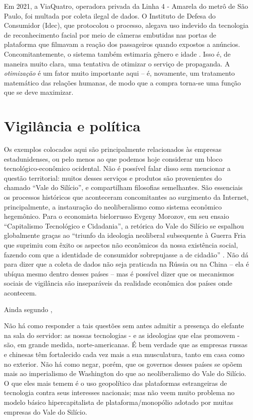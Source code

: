 Em 2021, a ViaQuatro, operadora privada da Linha 4 - Amarela do metrô de São Paulo, foi multada por coleta ilegal de dados.
O Instituto de Defesa do Consumidor (Idec), que protocolou o processo, alegava uso indevido da tecnologia de reconhecimento facial por meio de câmeras embutidas nas portas de plataforma que filmavam a reação dos passageiros quando expostos a anúncios.
Concomitantemente, o sistema também estimaria gênero e idade
\cite{soprana_viaquatro_2021}.
Isso é, de maneira muito clara, uma tentativa de otimizar o serviço de propaganda.
A \textit{otimização} é um fator muito importante aqui -- é, novamente, um tratamento matemático das relações humanas, de modo que a compra torna-se uma função que se deve maximizar.

\section{Vigilância e política}\label{sec:1:politica}

Os exemplos colocados aqui são principalmente relacionados às empresas estadunidenses, ou pelo menos ao que podemos hoje considerar um bloco tecnológico-econômico ocidental.
Não é possível falar disso sem mencionar a questão territorial: muitos desses serviços e produtos são provenientes do chamado ``Vale do Silício'', e compartilham filosofias semelhantes.
São essenciais os processos históricos que aconteceram concomitantes ao surgimento da Internet, principalmente, a instauração do neoliberalismo como sistema econômico hegemônico.
Para o economista bielorrusso Evgeny Morozov, em seu ensaio ``Capitalismo Tecnológico e Cidadania'', a retórica do Vale do Silício se espalhou globalmente graças ao ``triunfo da ideologia neoliberal subsequente à Guerra Fria que suprimiu com êxito os aspectos não econômicos da nossa existência social, fazendo com que a identidade de consumidor sobrepujasse a de cidadão'' \cite[p.~19]{morozov_big_2018}.
Não dá para dizer que a coleta de dados não seja praticada na Rússia ou na China -- ela é ubíqua mesmo dentro desses países -- mas é possível dizer que os mecanismos sociais de vigilância são inseparáveis da realidade econômica dos países onde acontecem.

Ainda segundo \textcite[p.~15]{morozov_big_2018},

\begin{citacao}
    Não há como responder a tais questões sem antes admitir a presença do elefante na sala do servidor: as nossas tecnologias - e as ideologias que elas promovem - são, em grande medida, norte-americanas. 
    É bem verdade que as empresas russas e chinesas têm fortalecido cada vez mais a sua musculatura, tanto em casa como no exterior. 
    Não há como negar, porém, que os governos desses países se opõem mais ao imperialismo de Washington do que ao neoliberalismo do Vale do Silício. 
    O que eles mais temem é o uso geopolítico das plataformas estrangeiras de tecnologia contra seus interesses nacionais; mas não veem muito problema no modelo básico hipercapitalista de plataforma/monopólio adotado por muitas empresas do Vale do Silício. 
\end{citacao}


